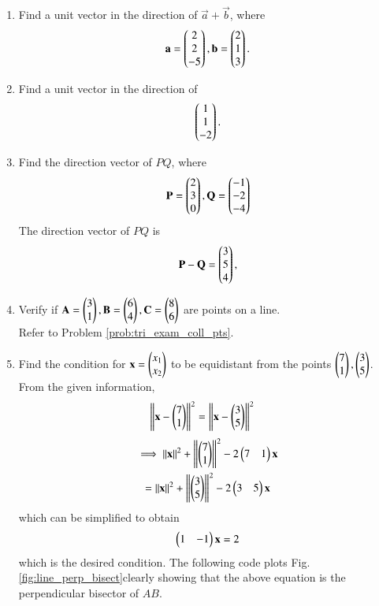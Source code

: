\begin{enumerate}[label=\arabic*.,ref=\thesubsection.\theenumi]
\item Find a unit vector in the direction of $\vec{a}+\vec{b}$, where 
%
\begin{align}
\mathbf{a} = \begin{pmatrix}2\\2\\-5\end{pmatrix}, \mathbf{b} = \begin{pmatrix}2\\1\\3\end{pmatrix}.
\end{align}
%
\item Find a unit vector in the direction of 
%
\begin{align}
\begin{pmatrix}1\\1\\-2\end{pmatrix}.
\end{align}
%
\item Find the direction vector of $PQ$, where 
\begin{align}
\mathbf{P} = \begin{pmatrix}2\\3\\0\end{pmatrix},
\mathbf{Q} = \begin{pmatrix}-1\\-2\\-4\end{pmatrix}
\end{align}
%
\solution The direction vector of $PQ$ is 
%
\begin{align}
\mathbf{P}-\mathbf{Q} = \begin{pmatrix}3\\5\\4\end{pmatrix},
\end{align}
%

\item Verify if $\mathbf{A} = \begin{pmatrix}3\\1\end{pmatrix}, \mathbf{B} = \begin{pmatrix}6\\4\end{pmatrix}, \mathbf{C} = \begin{pmatrix}8\\6\end{pmatrix}$ are points on a line.
\\
\solution Refer to Problem \ref{prob:tri_exam_coll_pts}.

\item Find the condition for $\mathbf{x} = \begin{pmatrix}x_1\\x_2\end{pmatrix}$ to be equidistant from the points $\begin{pmatrix}7\\1\end{pmatrix}, \begin{pmatrix}3\\5\end{pmatrix}$.
\label{prob:line_perp_bisect}
%
\\
\solution From the given information,
%
\begin{align}
\left\lVert\mathbf{x}-\begin{pmatrix}7\\1\end{pmatrix}\right\rVert^2&=\left\lVert\mathbf{x}-\begin{pmatrix}3\\5\end{pmatrix}\right\rVert^2
\end{align}
\begin{multline}
\implies \left\lVert\mathbf{x}\right\rVert^2 + \left\lVert\begin{pmatrix}7\\1\end{pmatrix}\right\rVert^2-2\begin{pmatrix}7&1\end{pmatrix}\mathbf{x} 
\\= 
 \left\lVert\mathbf{x}\right\rVert^2 + \left\lVert\begin{pmatrix}3\\5\end{pmatrix}\right\rVert^2-2\begin{pmatrix}3&5\end{pmatrix}\mathbf{x} 
\end{multline}
%
which can be simplified to obtain
\begin{align}
\label{eq:line_p_bisect}
\begin{pmatrix}1 & -1\end{pmatrix}\mathbf{x} = 2
\end{align}
%
which is the desired condition.  
The following code plots Fig. \ref{fig:line_perp_bisect}clearly showing that the above equation 
 is the perpendicular bisector of $AB$.


\end{enumerate}
